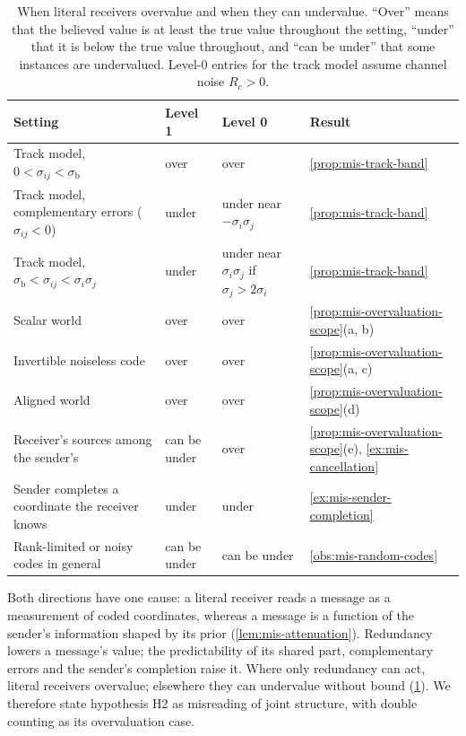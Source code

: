 \begin{table}[t]
\centering\small
\caption{When literal receivers overvalue and when they can undervalue. ``Over'' means that the believed value is at least the true value throughout the setting, ``under'' that it is below the true value throughout, and ``can be under'' that some instances are undervalued. Level-0 entries for the track model assume channel noise $R_c>0$.}\label{tab:mis-scope}
\begin{tabular}{@{}>{\raggedright\arraybackslash}p{}>{\raggedright\arraybackslash}p{}>{\raggedright\arraybackslash}p{}>{\raggedright\arraybackslash}p{}@{}}
\toprule
Setting & Level 1 & Level 0 & Result\\
\midrule
Track model, $0<\sigma_{ij}<\sigma_{\mathrm b}$ & over & over & \cref{prop:mis-track-band}\\
Track model, complementary errors ($\sigma_{ij}<0$) & under & under near $-\sigma_i\sigma_j$ & \cref{prop:mis-track-band}\\
Track model, $\sigma_{\mathrm b}<\sigma_{ij}<\sigma_i\sigma_j$ & under & under near $\sigma_i\sigma_j$ if $\sigma_j>2\sigma_i$ & \cref{prop:mis-track-band}\\
Scalar world & over & over & \cref{prop:mis-overvaluation-scope}(a, b)\\
Invertible noiseless code & over & over & \cref{prop:mis-overvaluation-scope}(a, c)\\
Aligned world & over & over & \cref{prop:mis-overvaluation-scope}(d)\\
Receiver's sources among the sender's & can be under & over & \cref{prop:mis-overvaluation-scope}(e), \cref{ex:mis-cancellation}\\
Sender completes a coordinate the receiver knows & under & under & \cref{ex:mis-sender-completion}\\
Rank-limited or noisy codes in general & can be under & can be under & \cref{obs:mis-random-codes}\\
\bottomrule
\end{tabular}
\end{table}

Both directions have one cause: a literal receiver reads a message as a measurement of coded coordinates, whereas a message is a function of the sender's information shaped by its prior (\cref{lem:mis-attenuation}). Redundancy lowers a message's value; the predictability of its shared part, complementary errors and the sender's completion raise it. Where only redundancy can act, literal receivers overvalue; elsewhere they can undervalue without bound (\cref{tab:mis-scope}). We therefore state hypothesis H2 as misreading of joint structure, with double counting as its overvaluation case.

